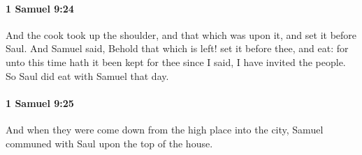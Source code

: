 		\paragraph{1 Samuel 9:24} %
			\label{1SAMUEL-9-24}

			And the cook took up the shoulder, and that which was upon it, and set it before Saul. And Samuel said, Behold that which is left! set it before thee, and eat: for unto this time hath it been kept for thee since I said, I have invited the people. So Saul did eat with Samuel that day.


		\paragraph{1 Samuel 9:25} %
			\label{1SAMUEL-9-25}

			And when they were come down from the high place into the city, Samuel communed with Saul upon the top of the house.

